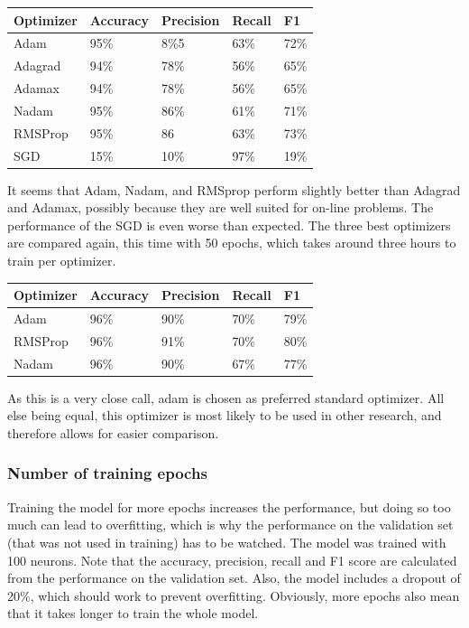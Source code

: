 \documentclass[
a4paper,
pagesize,
pdftex,
12pt,
twoside, %
BCOR=5mm, %
ngerman,
fleqn,
final,
]{scrartcl}
\begin{document}
	\begin{tabular}{ | p{3cm} || p{2cm}|p{2cm}|p{2cm}|p{2cm}|  }
		\hline
		\textbf{Optimizer} & \textbf{Accuracy} & \textbf{Precision} & \textbf{Recall} & \textbf{F1} \\
		\hline
		Adam & 95\% &  8\%5 &  63\% &  72\% \\  
		Adagrad & 94\% &  78\% &  56\% &  65\% \\ 
		Adamax & 94\% &  78\% &  56\% &  65\% \\ 
		Nadam & 95\% &  86\% &  61\% &  71\% \\ 
		RMSProp & 95\% &  86 &  63\% &  73\% \\ 
		SGD & 15\% &  10\% &  97\% & 19\% \\
		\hline
		\hline
	\end{tabular}
	
	It seems that Adam, Nadam, and RMSprop perform slightly better than Adagrad and Adamax, possibly because they are well suited for on-line problems. The performance of the SGD is even worse than expected. The three best optimizers are compared again, this time with 50 epochs, which takes around three hours to train per optimizer.
	
	\begin{tabular}{ | p{3cm} || p{2cm}|p{2cm}|p{2cm}|p{2cm}|  }
		\hline
		\textbf{Optimizer} & \textbf{Accuracy} & \textbf{Precision} & \textbf{Recall} & \textbf{F1} \\
		\hline
		Adam & 96\%& 90\%& 70\%& 79\% \\
		RMSProp & 96\% &  91\% &  70\% &  80\% \\ 
		Nadam & 96\% & 90\% & 67\% & 77\%\\
		\hline
		\hline
	\end{tabular}
	
	As this is a very close call, adam is chosen as preferred standard optimizer. All else being equal, this optimizer is most likely to be used in other research, and therefore allows for easier comparison.
	
	\subsubsection{Number of training epochs}
	Training the model for more epochs increases the performance, but doing so too much can lead to overfitting, which is why the performance on the validation set (that was not used in training) has to be watched. The model was trained with 100 neurons. Note that the accuracy, precision, recall and F1 score are calculated from the performance on the validation set. Also, the model includes a dropout of 20\%, which should work to prevent overfitting. Obviously, more epochs also mean that it takes longer to train the whole model.
	
\end{document}
